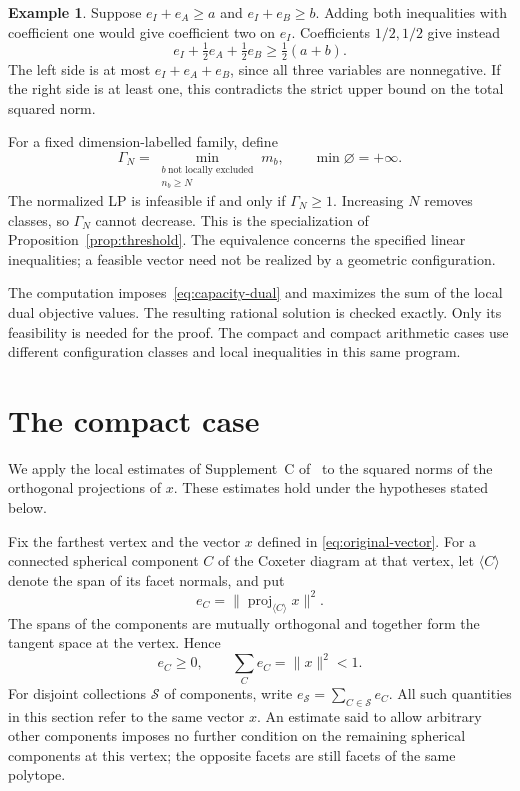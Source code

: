 \documentclass[11pt]{article}
\theoremstyle{definition}
\newtheorem*{example*}{Example}
\theoremstyle{remark}
\numberwithin{equation}{section}
\newcommand{\norm}[1]{\lVert #1\rVert}
\begin{document}
\begin{example*}
Suppose $e_I+e_A\ge a$ and $e_I+e_B\ge b$. Adding both
inequalities with coefficient one would give coefficient two on
$e_I$. Coefficients $1/2,1/2$ give instead
\[
           e_I+\tfrac12e_A+\tfrac12e_B\ge\tfrac12(a+b).
\]
The left side is at most $e_I+e_A+e_B$, since all three variables
are nonnegative. If the right side is at least one, this contradicts
the strict upper bound on the total squared norm.
\end{example*}

For a fixed dimension-labelled family, define
\begin{equation}\label{eq:threshold-energy-value}
 \Gamma_N=\min_{\substack{b\ \text{not locally excluded}\\ n_b\ge N}}m_b,
 \qquad\min\varnothing=+\infty.
\end{equation}
The normalized LP is infeasible if and only if $\Gamma_N\ge1$.
Increasing $N$ removes classes, so $\Gamma_N$ cannot decrease.
This is the specialization of Proposition~\ref{prop:threshold}.
The equivalence concerns the specified linear inequalities; a
feasible vector need not be realized by a geometric configuration.

The computation imposes~\eqref{eq:capacity-dual} and maximizes the
sum of the local dual objective values. The resulting rational
solution is checked exactly. Only its feasibility is needed for the
proof. The compact and compact arithmetic cases use different
configuration classes and local inequalities in this same program.

\section{The compact case}
\label{c:section}

We apply the local estimates of Supplement~C of~\cite{BoundsSupplement}
to the squared norms of the orthogonal projections of $x$.
These estimates hold under the hypotheses stated below.

Fix the farthest vertex and the vector $x$ defined in
\eqref{eq:original-vector}. For a connected spherical
component $C$ of the Coxeter diagram at that vertex, let
$\langle C\rangle$ denote the span of its facet normals, and put
\[
 e_C=\norm{\operatorname{proj}_{\langle C\rangle}x}^2.
\]
The spans of the components are mutually orthogonal and together form
the tangent space at the vertex. Hence
\begin{equation}\label{c:budget}
 e_C\ge0,\qquad \sum_C e_C=\norm{x}^2<1.
\end{equation}
For disjoint collections $\mathcal S$ of components, write
$e_{\mathcal S}=\sum_{C\in\mathcal S}e_C$. All such quantities in this
section refer to the same vector $x$. An estimate said to allow
arbitrary other components imposes no further condition on the remaining
spherical components at this vertex; the opposite facets are still
facets of the same polytope.
\end{document}
